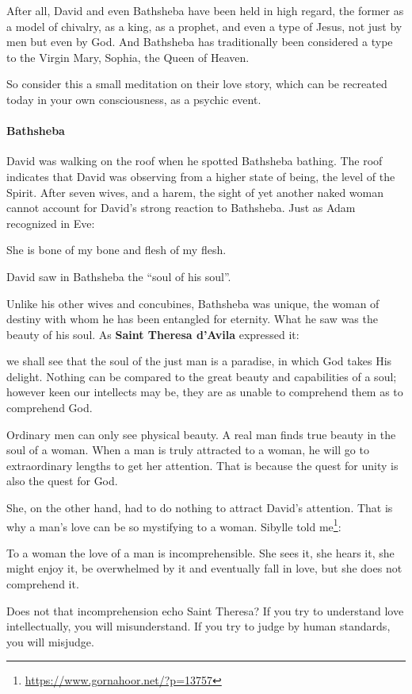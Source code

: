 After all, David and even Bathsheba have been held in high regard, the former as a model of chivalry, as a king, as a prophet, and even a type of Jesus, not just by men but even by God. And Bathsheba has traditionally been considered a type to the Virgin Mary, Sophia, the Queen of Heaven.

So consider this a small meditation on their love story, which can be recreated today in your own consciousness, as a psychic event.

\paragraph{Bathsheba}
David was walking on the roof when he spotted Bathsheba bathing. The roof indicates that David was observing from a higher state of being, the level of the Spirit. After seven wives, and a harem, the sight of yet another naked woman cannot account for David's strong reaction to Bathsheba. Just as Adam recognized in Eve:

\begin{quotex}
She is bone of my bone and flesh of my flesh.

\end{quotex}
David saw in Bathsheba the “soul of his soul”.

Unlike his other wives and concubines, Bathsheba was unique, the woman of destiny with whom he has been entangled for eternity. What he saw was the beauty of his soul. As \textbf{Saint Theresa d'Avila} expressed it:

\begin{quotex}
we shall see that the soul of the just man is a paradise, in which God takes His delight. Nothing can be compared to the great beauty and capabilities of a soul; however keen our intellects may be, they are as unable to comprehend them as to comprehend God.

\end{quotex}
Ordinary men can only see physical beauty. A real man finds true beauty in the soul of a woman. When a man is truly attracted to a woman, he will go to extraordinary lengths to get her attention. That is because the quest for unity is also the quest for God.

She, on the other hand, had to do nothing to attract David's attention. That is why a man's love can be so mystifying to a woman. Sibylle told me\footnote{\url{https://www.gornahoor.net/?p=13757}}:

\begin{quotex}
To a woman the love of a man is incomprehensible. She sees it, she hears it, she might enjoy it, be overwhelmed by it and eventually fall in love, but she does not comprehend it.

\end{quotex}
Does not that incomprehension echo Saint Theresa? If you try to understand love intellectually, you will misunderstand. If you try to judge by human standards, you will misjudge.

